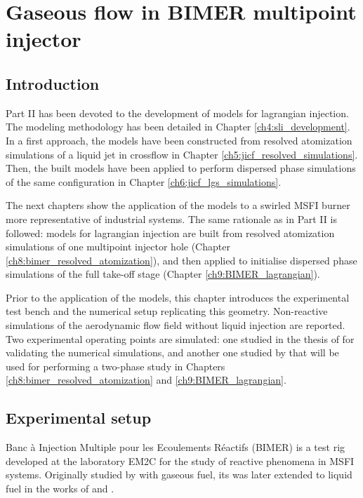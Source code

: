 \chapter{Gaseous flow in BIMER multipoint injector}
	\label{ch7:bimer_test_bench_and_aero}

\section{Introduction}

Part II has been devoted to the development of models for lagrangian injection. The modeling methodology has been detailed in Chapter \ref{ch4:sli_development}. In a first approach, the models have been constructed from resolved atomization simulations of a liquid jet in crossflow in Chapter \ref{ch5:jicf_resolved_simulations}. Then, the built models have been applied to perform dispersed phase simulations of the same configuration in Chapter \ref{ch6:jicf_lgs_simulations}.

The next chapters show the application of the models to a swirled MSFI burner more representative of industrial systems. The same rationale as in Part II is followed: models for lagrangian injection are built from resolved atomization simulations of one multipoint injector hole (Chapter \ref{ch8:bimer_resolved_atomization}), and then applied to initialise dispersed phase simulations of the full take-off stage (Chapter \ref{ch9:BIMER_lagrangian}). 

Prior to the application of the models, this chapter introduces the experimental test bench and the numerical setup replicating this geometry. Non-reactive simulations of the aerodynamic flow field without liquid injection are reported. Two experimental operating points are simulated: one studied in the thesis of  for validating the numerical simulations, and another one studied by  that will be used for performing a two-phase study in Chapters \ref{ch8:bimer_resolved_atomization} and \ref{ch9:BIMER_lagrangian}.


\section{Experimental setup}

Banc à Injection Multiple pour les Ecoulements Réactifs (BIMER) is a test rig developed at the laboratory EM2C for the study of reactive phenomena in MSFI systems. Originally studied by  with gaseous fuel, its was later extended to liquid fuel in the works of  and .


